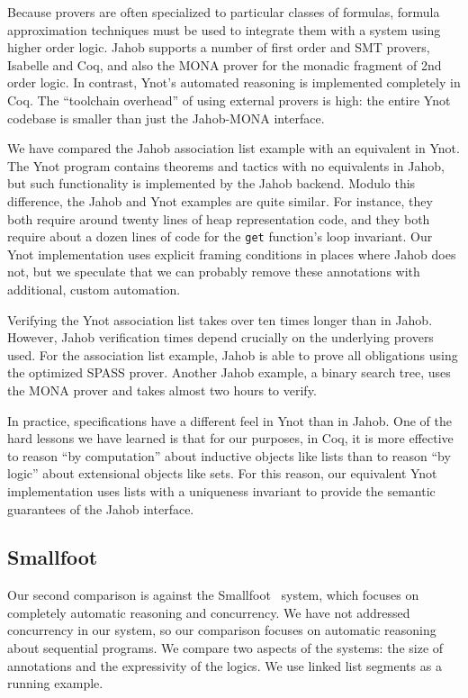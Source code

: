 \documentclass[preprint,nocopyrightspace]{sigplanconf}
\newcommand{\cd}[1]{\texttt{#1}}
\begin{document}
{Because provers are often specialized to particular
classes of formulas, formula approximation techniques must be used to integrate them with
a system using higher order logic. Jahob supports a number of first order and SMT provers,
Isabelle and Coq, and also the MONA prover for the monadic fragment of 2nd order logic.  
In contrast, Ynot's automated reasoning is implemented completely in Coq.  
The ``toolchain overhead'' of using external provers is high: the 
entire Ynot codebase is smaller than just the Jahob-MONA interface.

We have compared the Jahob association list example with an equivalent
in Ynot.  The Ynot program contains theorems and tactics with
no equivalents in Jahob, but such functionality 
is implemented by the Jahob backend.  Modulo this difference, 
the Jahob and Ynot examples are quite similar.  For instance, they 
both require around twenty lines of heap representation code,
and they both require about a dozen lines of code for the
\cd{get} function's loop invariant.  Our Ynot implementation 
uses explicit framing conditions in
places where Jahob does not, but we speculate that we can probably
remove these annotations with additional, custom automation.

Verifying the Ynot association list takes over ten times longer than in Jahob.
However, Jahob verification times depend crucially on the underlying
provers used.  For the association list example, Jahob is able to prove
all obligations using the optimized SPASS prover.  Another Jahob example,
a binary search tree, uses the MONA prover and takes almost two hours to verify.   

In practice, specifications have a different feel in Ynot than in Jahob.  One of
the hard lessons we have learned is that for our purposes, in Coq, 
it is more effective to reason ``by computation'' about inductive objects like lists
than to reason ``by logic'' about extensional objects like sets.  For this reason,
our equivalent Ynot implementation
uses lists with a uniqueness invariant to provide the semantic guarantees
of the Jahob interface.

\subsection{Smallfoot}

Our second comparison is against the Smallfoot~\cite{smallfoot}
system, which focuses on completely automatic reasoning and
concurrency.  We have not addressed concurrency in our system, so
our comparison focuses on automatic reasoning about sequential
programs.  We compare two aspects of the systems: the size of
annotations and the expressivity of the
logics. We use linked list segments as a running example.

}
\end{document}
